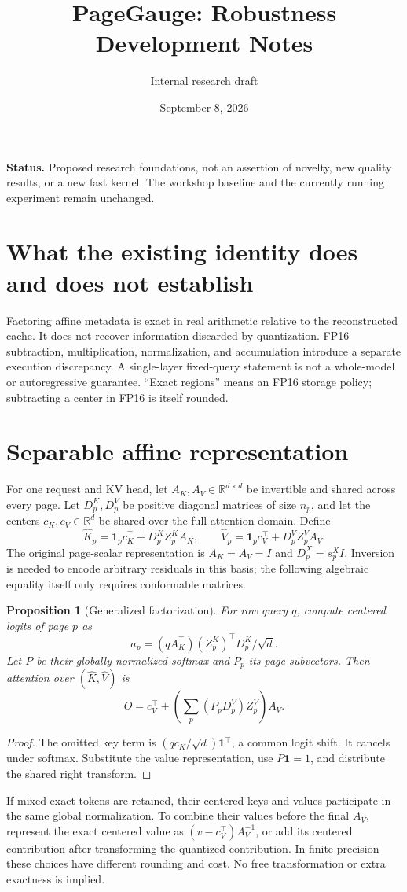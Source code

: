\documentclass[11pt]{article}
\title{PageGauge: Robustness Development Notes}
\author{Internal research draft}
\date{September 8, 2026}
\newtheorem{proposition}{Proposition}
\begin{document}
\maketitle
\noindent\textbf{Status.} Proposed research foundations, not an assertion of
novelty, new quality results, or a new fast kernel. The workshop baseline and
the currently running experiment remain unchanged.

\section{What the existing identity does and does not establish}
Factoring affine metadata is exact in real arithmetic relative to the
reconstructed cache. It does not recover information discarded by quantization.
FP16 subtraction, multiplication, normalization, and accumulation introduce a
separate execution discrepancy. A single-layer fixed-query statement is not a
whole-model or autoregressive guarantee. ``Exact regions'' means an FP16 storage
policy; subtracting a center in FP16 is itself rounded.

\section{Separable affine representation}
For one request and KV head, let $A_K,A_V\in\mathbb R^{d\times d}$ be invertible
and shared across every page. Let $D_p^K,D_p^V$ be positive diagonal matrices of
size $n_p$, and let the centers $c_K,c_V\in\mathbb R^d$ be shared over the full
attention domain. Define
\[
 \widehat K_p=\mathbf1_pc_K^\top+D_p^K Z_p^K A_K,\qquad
 \widehat V_p=\mathbf1_pc_V^\top+D_p^V Z_p^V A_V.
\]
The original page-scalar representation is $A_K=A_V=I$ and $D_p^X=s_p^X I$.
Inversion is needed to encode arbitrary residuals in this basis; the following
algebraic equality itself only requires conformable matrices.

\begin{proposition}[Generalized factorization]
For row query $q$, compute centered logits of page $p$ as
\[
 a_p=(qA_K^\top)(Z_p^K)^\top D_p^K/\sqrt d.
\]
Let $P$ be their globally normalized softmax and $P_p$ its page subvectors.
Then attention over $(\widehat K,\widehat V)$ is
\[
 O=c_V^\top+\left(\sum_p (P_pD_p^V)Z_p^V\right)A_V.
\]
\end{proposition}
\begin{proof}
The omitted key term is $(qc_K/\sqrt d)\mathbf1^\top$, a common logit shift.
It cancels under softmax. Substitute the value representation, use
$P\mathbf1=1$, and distribute the shared right transform.
\end{proof}
If mixed exact tokens are retained, their centered keys and values participate
in the same global normalization. To combine their values before the final
$A_V$, represent the exact centered value as $(v-c_V^\top)A_V^{-1}$, or add its
centered contribution after transforming the quantized contribution. In finite
precision these choices have different rounding and cost. No free transformation
or extra exactness is implied.
\end{document}
